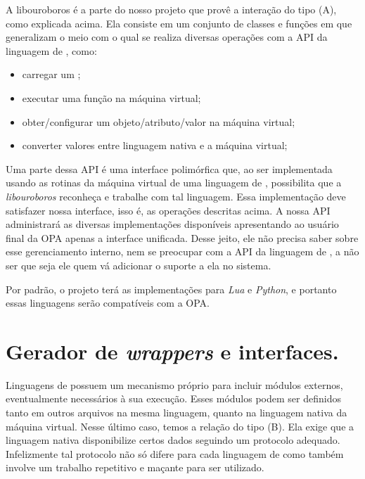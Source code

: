     A libouroboros é a parte do nosso projeto que provê a interação do tipo (A),
    como explicada acima. Ela consiste em um conjunto de classes e funções em 
    \CXX{} que generalizam o meio com o qual se realiza diversas operações com 
    a API da linguagem de \script{}, como:
    \begin{itemize}
      \item carregar um \script{};
      \item executar uma função na máquina virtual;
      \item obter/configurar um objeto/atributo/valor na máquina virtual;
      \item converter valores entre linguagem nativa e a máquina virtual;
    \end{itemize}
    Uma parte dessa API é uma interface polimórfica que, ao ser implementada usando
    as rotinas da máquina virtual de uma linguagem de \script{}, possibilita que
    a \emph{libouroboros} reconheça e trabalhe com tal linguagem. Essa
    implementação deve satisfazer nossa interface, isso é, as operações
    descritas acima. A nossa API administrará as diversas implementações
    disponíveis apresentando ao usuário final da OPA apenas a interface
    unificada. Desse jeito, ele não precisa saber sobre esse gerenciamento
    interno, nem se preocupar com a API da linguagem de \script{}, a não ser que
    seja ele quem vá adicionar o suporte a ela no sistema.

    
    Por padrão, o projeto terá as implementações para \textit{Lua} e
    \textit{Python}, e portanto essas linguagens serão compatíveis com a OPA.
    
  
  
  \section{Gerador de \emph{wrappers} e interfaces.}
  \label{sec:estrutura:opwig}


    Linguagens de \script{} possuem um mecanismo próprio para incluir módulos
    externos, eventualmente necessários à sua execução. Esses módulos podem ser
    definidos tanto em outros arquivos na mesma linguagem, quanto na linguagem
    nativa da máquina virtual. Nesse último caso, temos a relação do tipo (B). Ela
    exige que a linguagem nativa disponibilize certos dados seguindo um protocolo
    adequado. Infelizmente tal protocolo não só difere para cada linguagem de
    \script{} como também involve um trabalho repetitivo e maçante para ser utilizado. 

